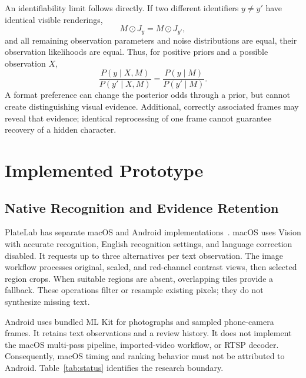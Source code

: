 \documentclass[journal]{IEEEtran}
\begin{document}
An identifiability limit follows directly. If two different identifiers $y\ne y'$ have identical visible renderings,
\begin{equation}\label{eq:ambiguity}
 M\odot J_y=M\odot J_{y'},
\end{equation}
and all remaining observation parameters and noise distributions are equal, their observation likelihoods are equal. Thus, for positive priors and a possible observation $X$,
\begin{equation}\label{eq:odds}
 \frac{P(y\mid X,M)}{P(y'\mid X,M)}
 =\frac{P(y\mid M)}{P(y'\mid M)}.
\end{equation}
A format preference can change the posterior odds through a prior, but cannot create distinguishing visual evidence. Additional, correctly associated frames may reveal that evidence; identical reprocessing of one frame cannot guarantee recovery of a hidden character.

\section{Implemented Prototype}\label{sec:implemented}
\subsection{Native Recognition and Evidence Retention}
PlateLab has separate macOS and Android implementations~\cite{platelab}. macOS uses Vision with accurate recognition, English recognition settings, and language correction disabled. It requests up to three alternatives per text observation. The image workflow processes original, scaled, and red-channel contrast views, then selected region crops. When suitable regions are absent, overlapping tiles provide a fallback. These operations filter or resample existing pixels; they do not synthesize missing text.

Android uses bundled ML Kit for photographs and sampled phone-camera frames. It retains text observations and a review history. It does not implement the macOS multi-pass pipeline, imported-video workflow, or RTSP decoder. Consequently, macOS timing and ranking behavior must not be attributed to Android. Table~\ref{tab:status} identifies the research boundary.
\end{document}
